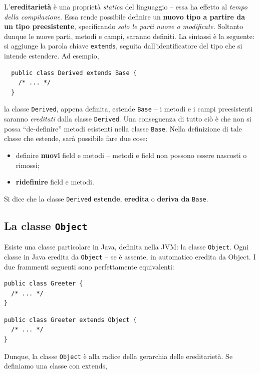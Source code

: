 \documentclass[\fontsizeclass,twocolumn]{\classname}
\theoremstyle{definition}
\theoremstyle{definition}
\begin{document}
L'\textbf{ereditarietà} è una proprietà \emph{statica} del linguaggio \--- essa
ha effetto al \emph{tempo della compilazione}. Essa rende possibile definire un
\textbf{nuovo tipo a partire da un tipo preesistente}, specificando \emph{solo
le parti nuove o modificate}. Soltanto dunque le nuove parti, metodi e campi,
saranno definiti. La sintassi è la seguente: si aggiunge la parola chiave
\texttt{extends}, seguita dall'identificatore del tipo che si intende estendere.
Ad esempio,

\begin{lstlisting}
  public class Derived extends Base {
    /* ... */
  }
\end{lstlisting}

la classe \texttt{Derived}, appena definita, estende \texttt{Base} \--- i metodi
e i campi preesistenti saranno \emph{ereditati} dalla classe \texttt{Derived}.
Una conseguenza di tutto ciò è che non si possa ``de-definire'' metodi esistenti
nella classe \texttt{Base}. Nella definizione di tale classe che estende, sarà
possibile fare due cose:
\begin{itemize}
  \item definire \textbf{nuovi} field e metodi \--- metodi e field non possono
  essere nascosti o rimossi;
  \item \textbf{ridefinire} field e metodi.
\end{itemize}

Si dice che la classe \texttt{Derived} \textbf{estende}, \textbf{eredita} o
\textbf{deriva da} \texttt{Base}.

\subsection{La classe \texttt{Object}}

Esiste una classe particolare in Java, definita nella JVM: la classe
\texttt{Object}. Ogni classe in Java eredita da \texttt{Object} \--- se è assente, in
automatico eredita da Object. I due frammenti seguenti sono perfettamente
equivalenti:

\begin{lstlisting}
public class Greeter {
  /* ... */
}
\end{lstlisting}

\begin{lstlisting}
public class Greeter extends Object {
  /* ... */
}
\end{lstlisting}

Dunque, la classe \texttt{Object} è alla radice della gerarchia delle ereditarietà.
Se definiamo una classe con extends,
\end{document}
